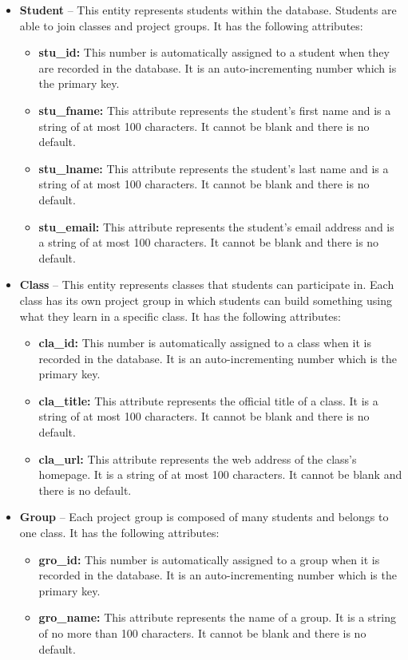 \documentclass[12pt]{article}
\begin{document}
\begin{itemize}
	\item \textbf{Student} -- This entity represents students within the database. Students are able to join classes and project groups. It has the following attributes:
	\begin{itemize}
		\item \textbf{stu\_id:} This number is automatically assigned to a student when they are recorded in the database. It is an auto-incrementing number which is the primary key. 
		\item \textbf{stu\_fname:} This attribute represents the student's first name and is a string of at most 100 characters. It cannot be blank and there is no default.
		\item \textbf{stu\_lname:} This attribute represents the student's last name and is a string of at most 100 characters. It cannot be blank and there is no default.
		\item \textbf{stu\_email:} This attribute represents the student's email address and is a string of at most 100 characters. It cannot be blank and there is no default.
	\end{itemize}

	\item \textbf{Class} -- This entity represents classes that students can participate in. Each class has its own project group in which students can build something using what they learn in a specific class. It has the following attributes:
	\begin{itemize}
		\item \textbf{cla\_id:} This number is automatically assigned to a class when it is recorded in the database. It is an auto-incrementing number which is the primary key. 
		\item \textbf{cla\_title:} This attribute represents the official title of a class. It is a string of at most 100 characters. It cannot be blank and there is no default.
		\item \textbf{cla\_url:} This attribute represents the web address of the class's homepage. It is a string of at most 100 characters. It cannot be blank and there is no default. 
	\end{itemize}

	\item \textbf{Group} -- Each project group is composed of many students and belongs to one class. It has the following attributes:
	\begin{itemize}
		\item \textbf{gro\_id:} This number is automatically assigned to a group when it is recorded in the database. It is an auto-incrementing number which is the primary key. 
		\item \textbf{gro\_name:} This attribute represents the name of a group. It is a string of no more than 100 characters. It cannot be blank and there is no default. 
	\end{itemize}


\end{itemize}
\end{document}
